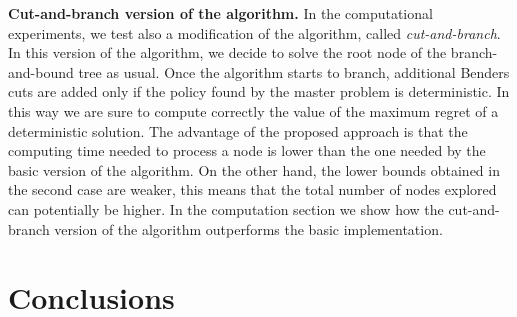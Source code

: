 \documentclass[sigconf]{aamas}  %
\begin{document}
\textbf{Cut-and-branch version of the algorithm.}  %
In the computational experiments, we test also a modification of the algorithm, called \textit{cut-and-branch}. In this version of the algorithm, we decide to solve the root node of the branch-and-bound tree as usual. %
Once the algorithm starts to branch, additional Benders cuts are added only if the policy found by the master problem is deterministic. In this way we are sure to compute correctly the value of the maximum regret of a deterministic solution. The advantage of the proposed approach is that the computing time needed to process a node is lower than the one needed by the basic version of the algorithm. On the other hand, the lower bounds obtained in the second case are weaker, this means that the total number of nodes explored can potentially be higher.
In the computation section we show how the cut-and-branch version of the algorithm outperforms the basic implementation.    









\section{Conclusions}
		







\end{document}

